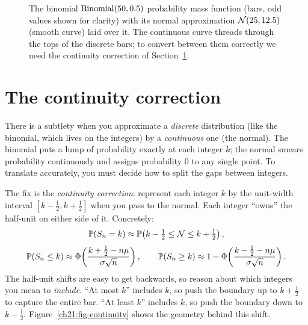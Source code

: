 \begin{figure}[H]
\centering
{}
\caption{The binomial $\Bin(50, 0.5)$ probability mass function (bars, odd values
shown for clarity) with its normal approximation $\Normal(25, 12.5)$ (smooth curve) laid
over it. The continuous curve threads through the tops of the discrete bars; to convert
between them correctly we need the continuity correction of
Section~\ref{ch21:continuity}.}
\label{ch21:fig-binom}
\end{figure}

\section{The continuity correction}
\label{ch21:continuity}

There is a subtlety when you approximate a \emph{discrete} distribution (like the
binomial, which lives on the integers) by a \emph{continuous} one (the normal). The
binomial puts a lump of probability exactly at each integer $k$; the normal smears
probability continuously and assigns probability $0$ to any single point. To translate
accurately, you must decide how to split the gaps between integers.

The fix is the \emph{continuity correction}: represent each integer $k$ by the unit-width
interval $[k - \tfrac12, k + \tfrac12]$ when you pass to the normal. Each integer ``owns'' the
half-unit on either side of it. Concretely:
\[
  \P(S_n = k) \approx \P\!\left(k - \tfrac12 \le \Normal \le k + \tfrac12\right),
\]
\[
  \P(S_n \le k) \approx \Phi\!\left(\frac{k + \tfrac12 - n\mu}{\sigma\sqrt n}\right),
  \qquad
  \P(S_n \ge k) \approx 1 - \Phi\!\left(\frac{k - \tfrac12 - n\mu}{\sigma\sqrt n}\right).
\]
The half-unit shifts are easy to get backwards, so reason about which integers you mean
to \emph{include}. ``At most $k$'' includes $k$, so push the boundary up to $k+\tfrac12$
to capture the entire bar. ``At least $k$'' includes $k$, so push the boundary down to $k-\tfrac12$.
Figure~\ref{ch21:fig-continuity} shows the geometry behind this shift.

